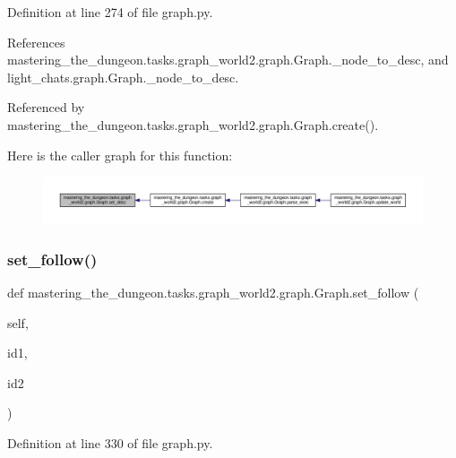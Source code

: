 Definition at line 274 of file graph.\+py.



References mastering\+\_\+the\+\_\+dungeon.\+tasks.\+graph\+\_\+world2.\+graph.\+Graph.\+\_\+node\+\_\+to\+\_\+desc, and light\+\_\+chats.\+graph.\+Graph.\+\_\+node\+\_\+to\+\_\+desc.



Referenced by mastering\+\_\+the\+\_\+dungeon.\+tasks.\+graph\+\_\+world2.\+graph.\+Graph.\+create().

Here is the caller graph for this function\+:
\nopagebreak
\begin{figure}[H]
\begin{center}
\leavevmode
\includegraphics[width=350pt]{classmastering__the__dungeon_1_1tasks_1_1graph__world2_1_1graph_1_1Graph_ac75e6e8afd506f1cfbcc4f540891ce87_icgraph}
\end{center}
\end{figure}
\mbox{\label{classmastering__the__dungeon_1_1tasks_1_1graph__world2_1_1graph_1_1Graph_a2ff0825e34c0894b86cef3a5076348ed}} 
\subsubsection{\texorpdfstring{set\+\_\+follow()}{set\_follow()}}
{\footnotesize\ttfamily def mastering\+\_\+the\+\_\+dungeon.\+tasks.\+graph\+\_\+world2.\+graph.\+Graph.\+set\+\_\+follow (\begin{DoxyParamCaption}\item[{}]{self,  }\item[{}]{id1,  }\item[{}]{id2 }\end{DoxyParamCaption})}



Definition at line 330 of file graph.\+py.



